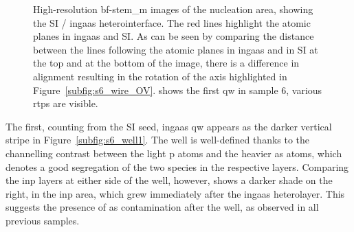 \begin{figure}
{
    }
    \caption[High-resolution \acs{bf}-\acs{stem_m} images of sample 6.]{High-resolution \acs{bf}-\acs{stem_m} images of  the nucleation area, showing the \acs{SI} / \acs{ingaas} heterointerface. The red lines highlight the  atomic planes in \acs{ingaas} and \acs{SI}. As can be seen by comparing the distance between the lines following the atomic planes in \acs{ingaas} and in \acs{SI} at the top and at the bottom of the image, there is a difference in alignment resulting in the rotation of the  axis highlighted in Figure~\ref{subfig:s6_wire_OV}.  shows the first \acl{qw} in sample 6, various \acs{rtp}s are visible.}
    \label{fig:s6_HR}
\end{figure}

The first, counting from the \acl{SI} seed, \acs{ingaas} \acl{qw} appears as the darker vertical stripe in Figure~\ref{subfig:s6_well1}. The well is well-defined thanks to the channelling contrast between the light \acl{p} atoms and the heavier \acs{as} atoms, which denotes a good segregation of the two species in the respective layers. Comparing the \acs{inp} layers at either side of the well, however, shows a darker shade on the right, in the \acs{inp} area, which grew immediately after the \acs{ingaas} heterolayer. This suggests the presence of \acl{as} contamination after the well, as observed in all previous samples.
\par


